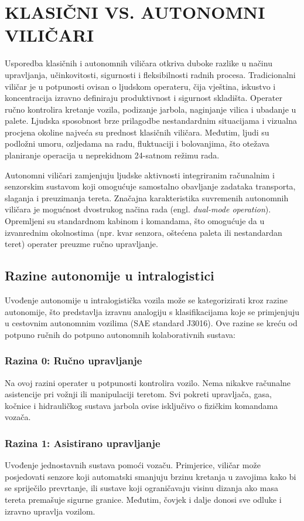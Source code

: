 \section{KLASIČNI VS. AUTONOMNI VILIČARI}
Usporedba klasičnih i autonomnih viličara otkriva duboke razlike u načinu upravljanja, učinkovitosti, sigurnosti i fleksibilnosti radnih procesa. Tradicionalni viličar je u potpunosti ovisan o ljudskom operateru, čija vještina, iskustvo i koncentracija izravno definiraju produktivnost i sigurnost skladišta. Operater ručno kontrolira kretanje vozila, podizanje jarbola, naginjanje vilica i ubadanje u palete. Ljudska sposobnost brze prilagodbe nestandardnim situacijama i vizualna procjena okoline najveća su prednost klasičnih viličara. Međutim, ljudi su podložni umoru, ozljedama na radu, fluktuaciji i bolovanjima, što otežava planiranje operacija u neprekidnom 24-satnom režimu rada.

Autonomni viličari zamjenjuju ljudske aktivnosti integriranim računalnim i senzorskim sustavom koji omogućuje samostalno obavljanje zadataka transporta, slaganja i preuzimanja tereta. Značajna karakteristika suvremenih autonomnih viličara je mogućnost dvostrukog načina rada (engl. \textit{dual-mode operation}). Opremljeni su standardnom kabinom i komandama, što omogućuje da u izvanrednim okolnostima (npr. kvar senzora, oštećena paleta ili nestandardan teret) operater preuzme ručno upravljanje.

\subsection{Razine autonomije u intralogistici}
Uvođenje autonomije u intralogistička vozila može se kategorizirati kroz razine autonomije, što predstavlja izravnu analogiju s klasifikacijama koje se primjenjuju u cestovnim autonomnim vozilima (SAE standard J3016). Ove razine se kreću od potpuno ručnih do potpuno autonomnih kolaborativnih sustava:

\subsubsection{Razina 0: Ručno upravljanje}
Na ovoj razini operater u potpunosti kontrolira vozilo. Nema nikakve računalne asistencije pri vožnji ili manipulaciji teretom. Svi pokreti upravljača, gasa, kočnice i hidrauličkog sustava jarbola ovise isključivo o fizičkim komandama vozača.

\subsubsection{Razina 1: Asistirano upravljanje}
Uvođenje jednostavnih sustava pomoći vozaču. Primjerice, viličar može posjedovati senzore koji automatski smanjuju brzinu kretanja u zavojima kako bi se spriječilo prevrtanje, ili sustave koji ograničavaju visinu dizanja ako masa tereta premašuje sigurne granice. Međutim, čovjek i dalje donosi sve odluke i izravno upravlja vozilom.

